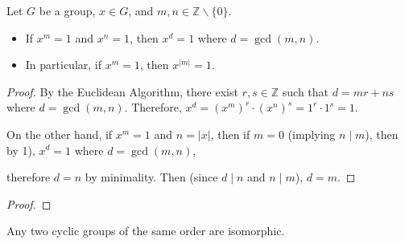 \documentclass[11pt,a4paper]{article}
\begin{document}
\begin{prop}
    Let \( G \) be a group, \( x \in G \), and \( m, n \in \mathbb{Z} \backslash \{0\} \).
\begin{itemize}
    \item If \( x^m = 1 \) and \( x^n = 1 \), then \( x^d = 1 \) where \( d = \gcd(m, n) \).
    \item In particular, if \( x^m = 1 \), then \( x^{\lvert m \rvert} = 1 \).
\end{itemize}
\end{prop}



\begin{proof}
    By the Euclidean Algorithm, there exist \( r, s \in \mathbb{Z} \) such that \( d = mr + ns \) where \( d = \gcd(m, n) \).
    Therefore, \( x^d = (x^m)^r \cdot (x^n)^s = 1^r \cdot 1^s = 1 \).

    On the other hand, if \( x^m = 1 \) and \( n = \lvert x \rvert \), then if \( m = 0 \) (implying \( n \mid m \)),  then by 1), \( x^d = 1 \) where \( d = \gcd(m, n) \),
    
    therefore \( d = n \) by minimality. Then (since \( d \mid n \) and \( n \mid m \)), \( d = m \).
\end{proof}


\begin{proof}
    
\end{proof}

\begin{teo}
    Any two cyclic groups of the same order are isomorphic.
\end{teo}
\end{document}

